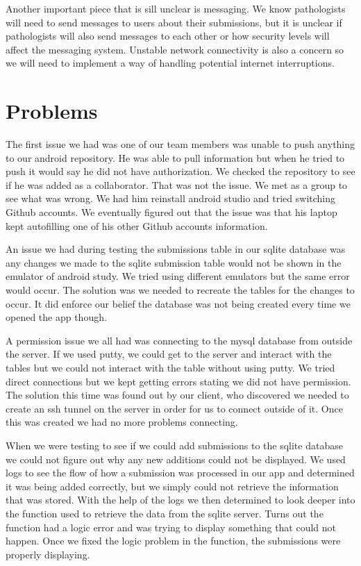 \documentclass[onecolumn, draftclsnofoot,10pt, compsoc]{IEEEtran}
\begin{document}
Another important piece that is sill unclear is messaging. We know pathologists will need to send messages to users about their submissions, but it is unclear if pathologists will also send messages to each other or how security levels will affect the messaging system. Unstable network connectivity is also a concern so we will need to implement a way of handling potential internet interruptions. 

\section{Problems}
The first issue we had was one of our team members was unable to push anything to our android repository. He was able to pull information but when he tried to push it would say he did not have authorization. We checked the repository to see if he was added as a collaborator. That was not the issue. We met as a group to see what was wrong. We had him reinstall android studio and tried switching Github accounts. We eventually figured out that the issue was that his laptop kept autofilling one of his other Github accounts information.

An issue we had during testing the submissions table in our sqlite database was any changes we made to the sqlite submission table would not be shown in the emulator of android study. We tried using different emulators but the same error would occur. The solution was we needed to recreate the tables for the changes to occur. It did enforce our belief the database was not being created every time we opened the app though.

A permission issue we all had was connecting to the mysql database from outside the server. If we used putty, we could get to the server and interact with the tables but we could not interact with the table without using putty. We tried direct connections but we kept getting errors stating we did not have permission. The solution this time was found out by our client, who discovered we needed to create an ssh tunnel on the server in order for us to connect outside of it. Once this was created we had no more problems connecting.

When we were testing to see if we could add submissions to the sqlite database we could not figure out why any new additions could not be displayed. We used logs to see the flow of how a submission was processed in our app and determined it was being added correctly, but we simply could not retrieve the information that was stored. With the help of the logs we then determined to look deeper into the function used to retrieve the data from the sqlite server. Turns out the function had a logic error and was trying to display something that could not happen. Once we fixed the logic problem in the function, the submissions were properly displaying.
\end{document}

